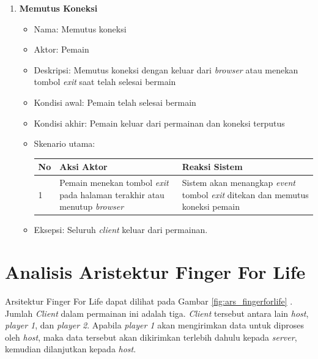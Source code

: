 \begin{enumerate}
\begin{itemize}
		\end{itemize}
	
	\item \textbf{Memutus Koneksi}
	
		\begin{itemize}
			\item Nama: Memutus koneksi
			
			\item Aktor: Pemain
			
			\item Deskripsi: Memutus koneksi dengan keluar dari \textit{browser} atau menekan tombol \textit{exit} saat telah selesai bermain
			
			\item Kondisi awal: Pemain telah selesai bermain
			
			\item Kondisi akhir: Pemain keluar dari permainan dan koneksi terputus
			
			\item Skenario utama:
			
\begin{tabular}{ |p{1cm}|p{4cm}|p{4cm}|}
	\hline
	No & Aksi Aktor & Reaksi Sistem \\ \hline
	1 & Pemain menekan tombol \textit{exit} pada halaman terakhir atau menutup \textit{browser} & Sistem akan menangkap \textit{event} tombol \textit{exit} ditekan dan memutus koneksi pemain \\ \hline
\end{tabular}
			
			\item Eksepsi: Seluruh \textit{client} keluar dari permainan.
		\end{itemize}
\end{enumerate}


\section{Analisis Aristektur Finger For Life}
Arsitektur Finger For Life dapat dilihat pada Gambar \ref{fig:ars_fingerforlife} . Jumlah \textit{Client} dalam permainan ini adalah tiga. \textit{Client} tersebut antara lain \textit{host}, \textit{player 1}, dan \textit{player 2}. Apabila \textit{player 1} akan mengirimkan data untuk diproses oleh \textit{host}, maka data tersebut akan dikirimkan terlebih dahulu kepada \textit{server}, kemudian dilanjutkan kepada \textit{host}.

